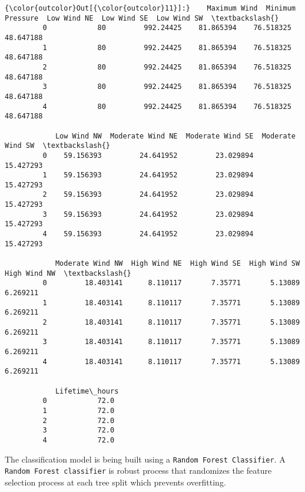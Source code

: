 \documentclass[11pt]{article}
\begin{document}
\begin{Verbatim}[commandchars=\\\{\}]
{\color{outcolor}Out[{\color{outcolor}11}]:}    Maximum Wind  Minimum Pressure  Low Wind NE  Low Wind SE  Low Wind SW  \textbackslash{}
         0            80         992.24425    81.865394    76.518325    48.647188   
         1            80         992.24425    81.865394    76.518325    48.647188   
         2            80         992.24425    81.865394    76.518325    48.647188   
         3            80         992.24425    81.865394    76.518325    48.647188   
         4            80         992.24425    81.865394    76.518325    48.647188   
         
            Low Wind NW  Moderate Wind NE  Moderate Wind SE  Moderate Wind SW  \textbackslash{}
         0    59.156393         24.641952         23.029894         15.427293   
         1    59.156393         24.641952         23.029894         15.427293   
         2    59.156393         24.641952         23.029894         15.427293   
         3    59.156393         24.641952         23.029894         15.427293   
         4    59.156393         24.641952         23.029894         15.427293   
         
            Moderate Wind NW  High Wind NE  High Wind SE  High Wind SW  High Wind NW  \textbackslash{}
         0         18.403141      8.110117       7.35771       5.13089      6.269211   
         1         18.403141      8.110117       7.35771       5.13089      6.269211   
         2         18.403141      8.110117       7.35771       5.13089      6.269211   
         3         18.403141      8.110117       7.35771       5.13089      6.269211   
         4         18.403141      8.110117       7.35771       5.13089      6.269211   
         
            Lifetime\_hours  
         0            72.0  
         1            72.0  
         2            72.0  
         3            72.0  
         4            72.0  
\end{Verbatim}
            
    The classification model is being built using a
\texttt{Random\ Forest\ Classifier}. A
\texttt{Random\ Forest\ classifier} is robust process that randomizes
the feature selection process at each tree split which prevents
overfitting.
\end{document}
